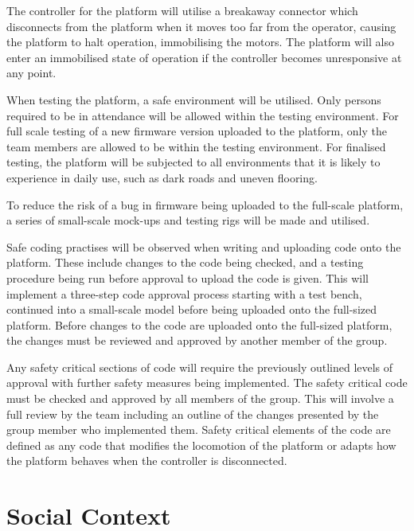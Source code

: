\documentclass [12pt]{article}
\begin{document}
The controller for the platform will utilise a breakaway connector which disconnects from the platform when it moves too far from the operator, causing the platform to halt operation, immobilising the motors.
The platform will also enter an immobilised state of operation if the controller becomes unresponsive at any point.


When testing the platform, a safe environment will be utilised. Only persons required to be in attendance will be allowed within the testing environment.
For full scale testing of a new firmware version uploaded to the platform, only the team members are allowed to be within the testing environment.
For finalised testing, the platform will be subjected to all environments that it is likely to experience in daily use, such as dark roads and uneven flooring.


To reduce the risk of a bug in firmware being uploaded to the full-scale platform, a series of small-scale mock-ups and testing rigs will be made and utilised.


Safe coding practises will be observed when writing and uploading code onto the platform.
These include changes to the code being checked, and a testing procedure being run before approval to upload the code is given.
This will implement a three-step code approval process starting with a test bench, continued into a small-scale model before being uploaded onto the full-sized platform.
Before changes to the code are uploaded onto the full-sized platform, the changes must be reviewed and approved by another member of the group.


Any safety critical sections of code will require the previously outlined levels of approval with further safety measures being implemented.
The safety critical code must be checked and approved by all members of the group.
This will involve a full review by the team including an outline of the changes presented by the group member who implemented them.
Safety critical elements of the code are defined as any code that modifies the locomotion of the platform or adapts how the platform behaves when the controller is disconnected.

\section{Social Context}\label{sec:Social_Context}
\end{document}
